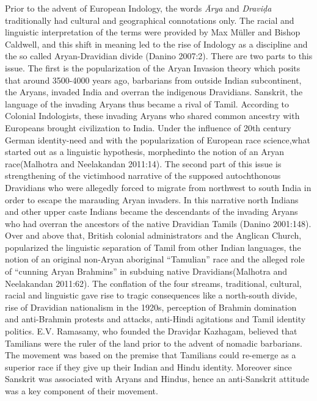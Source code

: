 Prior to the advent of European Indology, the words \textit{Ārya} and \textit{Draviḍa} traditionally had cultural and geographical connotations only. The racial and linguistic interpretation of the terms were provided by Max Müller and Bishop Caldwell, and this shift in meaning led to the rise of Indology as a discipline and the so called Aryan-Dravidian divide (Danino 2007:2). There are two parts to this issue. The first is the popularization of the Aryan Invasion theory which posits that around 3500-4000 years ago, barbarians from outside Indian subcontinent, the Aryans, invaded India and overran the indigenous Dravidians. Sanskrit, the language of the invading Aryans thus became a rival of Tamil. According to Colonial Indologists, these invading Aryans who shared common ancestry with Europeans brought civilization to India. Under the influence of 20th century German identity-need and with the popularization of European race science,what started out as a linguistic hypothesis, morphedinto the notion of an Aryan race(Malhotra and Neelakandan 2011:14). The second part of this issue is strengthening of the victimhood narrative of the supposed autochthonous Dravidians who were allegedly forced to migrate from northwest to south India in order to escape the marauding Aryan invaders. In this narrative north Indians and other upper caste Indians became the descendants of the invading Aryans who had overran the ancestors of the native Dravidian Tamils (Danino 2001:148). Over and above that, British colonial administrators and the Anglican Church, popularized the linguistic separation of Tamil from other Indian languages, the notion of an original non-Aryan aboriginal “Tamulian” race and the alleged role of “cunning Aryan Brahmins” in subduing native Dravidians(Malhotra and Neelakandan 2011:62). The conflation of the four streams, traditional, cultural, racial and linguistic gave rise to tragic consequences like a north-south divide, rise of Dravidian nationalism in the 1920s, perception of Brahmin domination and anti-Brahmin protests and attacks, anti-Hindi agitations and Tamil identity politics. E.V. Ramasamy, who founded the Draviḍar Kazhagam, believed that Tamilians were the ruler of the land prior to the advent of nomadic barbarians. The movement was based on the premise that Tamilians could re-emerge as a superior race if they give up their Indian and Hindu identity. Moreover since Sanskrit was associated with Aryans and Hindus, hence an anti-Sanskrit attitude was a key component of their movement.

